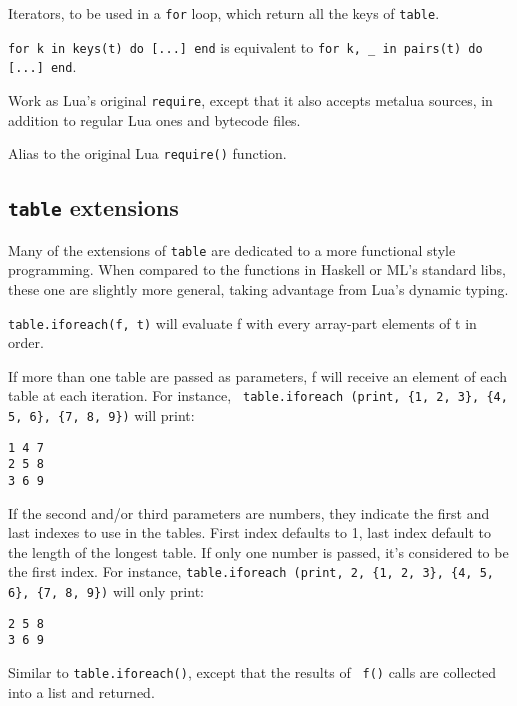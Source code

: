 Iterators, to be used in a {\tt for} loop, which return all the keys
of {\tt table}. 

{\tt for k in keys(t) do [...] end} is equivalent to {\tt for k, \_ in
  pairs(t) do [...] end}.



Work as Lua's original {\tt require}, except that it also accepts
metalua sources, in addition to regular Lua ones and bytecode files.


Alias to the original Lua {\tt require()} function.



\subsection{{\tt table} extensions}

Many of the extensions of {\tt table} are dedicated to a more
functional style programming. When compared to the functions in
Haskell or ML's standard libs, these one are slightly more general,
taking advantage from Lua's dynamic typing.


{\tt table.iforeach(f, t)} will evaluate f with every array-part
elements of t in order.

If more than one table are passed as parameters, f will receive an
element of each table at each iteration. For instance, {\tt
  table.iforeach (print, \{1, 2, 3\}, \{4, 5, 6\}, \{7, 8, 9\})} will
print:
\begin{verbatim}
1 4 7
2 5 8
3 6 9
\end{verbatim}

If the second and/or third parameters are numbers, they indicate the
first and last indexes to use in the tables. First index defaults to
1, last index default to the length of the longest table. If only one
number is passed, it's considered to be the first index. For instance,
{\tt table.iforeach (print, 2, \{1, 2, 3\}, \{4, 5, 6\}, \{7, 8, 9\})}
will only print:
\begin{verbatim}
2 5 8
3 6 9
\end{verbatim}


Similar to {\tt table.iforeach()}, except that the results of {\tt
  f()} calls are collected into a list and returned.

